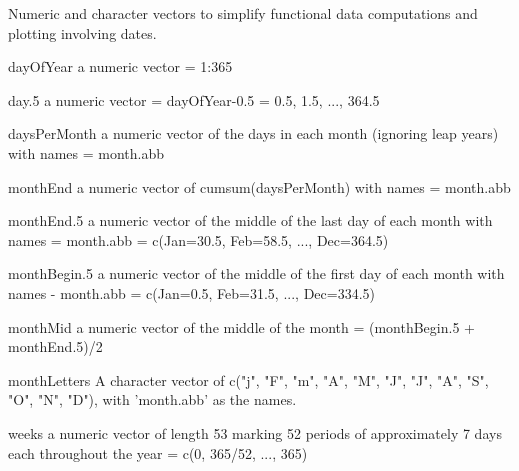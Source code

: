 \documentclass{article}
\begin{document}
\begin{Description}\relax
Numeric and character vectors to simplify functional data computations
and plotting involving dates.
\end{Description}
\begin{Format}\relax
\item[dayOfYear] a numeric vector = 1:365 

\item[day.5 ] a numeric vector = dayOfYear-0.5 = 0.5, 1.5, ..., 364.5 

\item[daysPerMonth] a numeric vector of the days in each month (ignoring leap years)
with names = month.abb

\item[monthEnd] a numeric vector of cumsum(daysPerMonth) with names = month.abb

\item[monthEnd.5] a numeric vector of the middle of the last day of each month with
names = month.abb = c(Jan=30.5, Feb=58.5, ..., Dec=364.5)

\item[monthBegin.5] a numeric vector of the middle of the first day of each month with
names - month.abb = c(Jan=0.5, Feb=31.5, ..., Dec=334.5) 

\item[monthMid] a numeric vector of the middle of the month = (monthBegin.5 +
monthEnd.5)/2  

\item[monthLetters] A character vector of c("j", "F", "m", "A", "M", "J", "J", "A",
"S", "O", "N", "D"), with 'month.abb' as the names.  

\item[weeks] a numeric vector of length 53 marking 52 periods of approximately 7
days each throughout the year = c(0, 365/52, ..., 365)
\end{Format}
\end{document}

